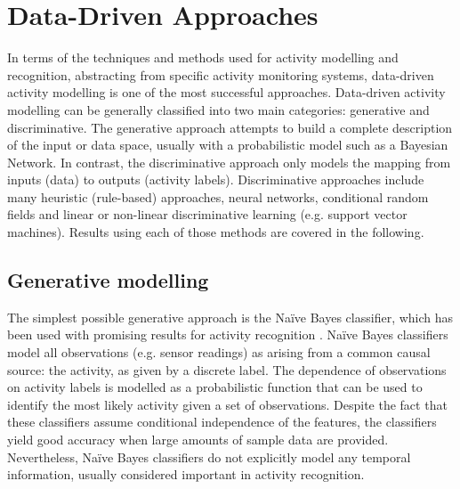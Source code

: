 \section{Data-Driven Approaches}
\label{sec:soa:datadriven}

In terms of the techniques and methods used for activity modelling and recognition, abstracting from specific activity monitoring systems, data-driven activity modelling is one of the most successful approaches. Data-driven activity modelling can be generally classified into two main categories: generative and discriminative. The generative approach attempts to build a complete description of the input or data space, usually with a probabilistic model such as a Bayesian Network. In contrast, the discriminative approach only models the mapping from inputs (data) to outputs (activity labels). Discriminative approaches include many heuristic (rule-based) approaches, neural networks, conditional random fields and linear or non-linear discriminative learning (e.g. support vector machines). Results using each of those methods are covered in the following.

\subsection{Generative modelling}

The simplest possible generative approach is the Na\"ive Bayes classifier, which has been used with promising results for activity recognition \cite{Bao2004} \cite{Brdiczka2007} \cite{Cook2009} \cite{Tapia2004} \cite{Kasteren2007} \cite{Maurer2006a}. Na\"ive Bayes classifiers model all observations (e.g. sensor readings) as arising from a common causal source: the activity, as given by a discrete label. The dependence of observations on activity labels is modelled as a probabilistic function that can be used to identify the most likely activity given a set of observations. Despite the fact that these classifiers assume conditional independence of the features, the classifiers yield good accuracy when large amounts of sample data are provided. Nevertheless, Na\"ive Bayes classifiers do not explicitly model any temporal information, usually considered important in activity recognition.

